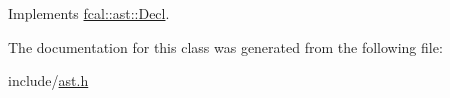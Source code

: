 Implements \hyperlink{classfcal_1_1ast_1_1Decl_a54761cf8b990cb2d478c606be6bc29c5}{fcal\+::ast\+::\+Decl}.



The documentation for this class was generated from the following file\+:\begin{DoxyCompactItemize}
\item 
include/\hyperlink{ast_8h}{ast.\+h}\end{DoxyCompactItemize}
